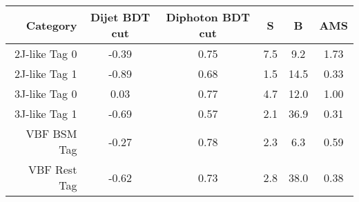 \begin{tabular}{ r | c | c | c | c | c } 
\hline 
Category       & Dijet BDT cut & Diphoton BDT cut & S & B & AMS \\ 
\hline 
2J-like  Tag 0 & -0.39        & 0.75            & 7.5    & 9.2        & 1.73         \\
2J-like  Tag 1 & -0.89        & 0.68            & 1.5    & 14.5       & 0.33         \\
3J-like  Tag 0 & 0.03         & 0.77            & 4.7    & 12.0       & 1.00         \\
3J-like  Tag 1 & -0.69        & 0.57            & 2.1    & 36.9       & 0.31         \\
VBF BSM Tag    & -0.27        & 0.78            & 2.3    & 6.3        & 0.59         \\
VBF Rest Tag   & -0.62        & 0.73            & 2.8    & 38.0       & 0.38         \\
\hline 
\end{tabular}
